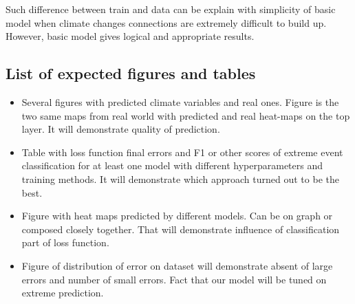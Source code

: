 \documentclass{article}
\begin{document}
Such difference between train and data can be explain with simplicity of basic model when climate changes connections are extremely difficult to build up. However, basic model gives logical and appropriate results. 


\subsection{List of expected figures and tables}
\begin{itemize}
    \item Several figures with predicted climate variables and real ones. Figure is the two same maps from real world with predicted and real heat-maps on the top layer. It will demonstrate quality of prediction.
    \item Table with loss function final errors and F1 or other scores of extreme event classification for at least one model with different hyperparameters and training methods. It will demonstrate which  approach turned out to be the best.
    \item Figure with heat maps predicted by different models. Can be on graph or composed closely together. That will demonstrate influence of classification part of loss function.
    \item Figure of distribution of error on dataset will demonstrate absent of large errors and  number of small errors. Fact that our model will be tuned on extreme prediction.
    
    
\end{itemize}

\pagebreak


\end{document}
